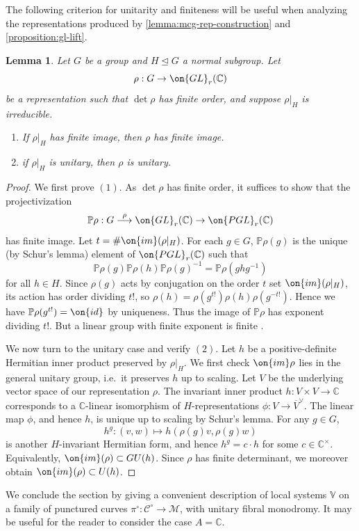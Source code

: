 \documentclass[12 pt]{amsart}
\theoremstyle{plain}
\newtheorem{lemma}[subsubsection]{Lemma}
\theoremstyle{definition}
\theoremstyle{remark}
\numberwithin{equation}{section}
\begin{document}
The following criterion for unitarity and finiteness will be useful when analyzing the representations produced by \autoref{lemma:mcg-rep-construction} and \autoref{proposition:gl-lift}.
\begin{lemma}
	\label{lemma:finite-rho-implies-finite-lift}
Let $G$ be a group and $H\trianglelefteq G$ a normal subgroup. Let $$\rho: G\to \on{GL}_r(\mathbb{C})$$ be a representation such that $\det\rho$ has finite order, and suppose $\rho|_H$ is irreducible.
\begin{enumerate}
\item If $\rho|_H$ has finite image, then $\rho$ has finite image.
\item if $\rho|_H$ is unitary, then $\rho$ is unitary.
\end{enumerate}
\end{lemma}
\begin{proof}
	We first prove $(1)$.
		As $\det\rho$ has finite order, it suffices to show that the
	projectivization $$\mathbb{P}\rho: G\overset{\rho}{\longrightarrow}
	\on{GL}_r(\mathbb{C})\to \on{PGL}_r(\mathbb{C})$$ has finite image. Let
$t=\#\on{im}(\rho|_H)$. For each $g\in G$, $\mathbb{P}\rho(g)$ is the unique
(by Schur's lemma) element of $\on{PGL}_r(\mathbb{C})$ such that
$$\mathbb{P}\rho(g)\mathbb{P}\rho(h)\mathbb{P}\rho(g)^{-1}=\mathbb{P}\rho(ghg^{-1})$$ for all $h\in H$.
Since $\rho(g)$ acts by conjugation on the order $t$ set $\on{im}(\rho|_H)$, its action 
has order dividing $t!$, so $\rho(h)=\rho(g^{t!})\rho(h)\rho(g^{-t!})$. Hence we have $\mathbb{P}\rho(g^{t!})=\on{id}$ by
uniqueness. Thus the image of $\mathbb{P}\rho$ has exponent dividing $t!$. But a linear group with finite exponent is finite \cite{burnside1905criteria}.

We now turn to the unitary case and verify $(2)$.
Let $h$ be a positive-definite Hermitian inner product preserved by $\rho|_H$. 
We first check $\on{im}\rho$ lies in the general unitary group, i.e.~it preserves $h$ up to scaling.
	Let $V$ be the underlying vector space of our
	representation $\rho$. The invariant inner product $h: V \times V \to \mathbb C$ corresponds to a $\mathbb{C}$-linear isomorphism of $H$-representations $\phi: V \to \overline{V}^\vee$.
	The linear map $\phi$, and hence $h$, is unique up to scaling by Schur's lemma. 
	For any $g\in G$, $$h^g: (v, w)\mapsto h(\rho(g)v, \rho(g)w)$$ is
	another $H$-invariant Hermitian form, and hence $h^g=c\cdot h$ for some
	$c\in\mathbb{C}^\times.$ 
	Equivalently, $\on{im}(\rho)\subset GU(h)$. 
	Since $\rho$ has finite determinant, we moreover obtain
	$\on{im}(\rho)\subset U(h)$.\qedhere
\end{proof}
We conclude the section by giving a convenient description of local systems
$\mathbb V$ on a family of punctured curves $\pi^\circ: \mathscr C^\circ \to
\mathscr M$, with unitary fibral monodromy. It may be useful for the reader to consider the case $A=\mathbb{C}$.
\end{document}
